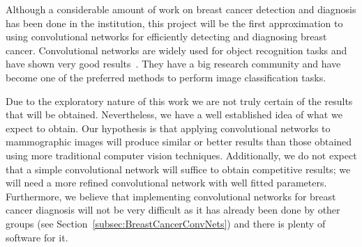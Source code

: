 Although a considerable amount of work on breast cancer detection and diagnosis has been done in the institution, this project will be the first approximation to using convolutional networks for efficiently detecting and diagnosing breast cancer. Convolutional networks are widely used for object recognition tasks and have shown very good results~\cite{Russakovsky2014, Taigman2014, Dieleman2015}. They have a big research community and have become one of the preferred methods to perform image classification tasks.%

Due to the exploratory nature of this work we are not truly certain of the results that will be obtained. Nevertheless, we have a well established idea of what we expect to obtain. Our hypothesis is that applying convolutional networks to mammographic images will produce similar or better results than those obtained using more traditional computer vision techniques. Additionally, we do not expect that a simple convolutional network will suffice to obtain competitive results; we will need a more refined convolutional network with well fitted parameters. Furthermore, we believe that implementing convolutional networks for breast cancer diagnosis will not be very difficult as it has already been done by other groups (see Section~\ref{subsec:BreastCancerConvNets}) and there is plenty of software for it. 

